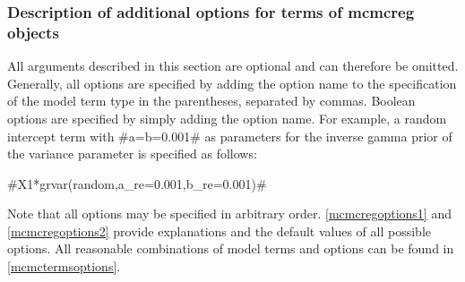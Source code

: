 \subsubsection{Description of additional options for terms of mcmcreg objects}
\label{mcmclocaloptions}

All arguments described in this section are optional and can
therefore be omitted. Generally, all options are specified by
adding the option name to the specification of the model term type
in the parentheses, separated by commas. Boolean options are
specified by simply adding the option name. For example, a random
intercept term with #a=b=0.001# as parameters for the inverse
gamma prior of the variance parameter is
specified as follows:

#X1*grvar(random,a_re=0.001,b_re=0.001)#

Note that all options may be specified in arbitrary order.
\autoref{mcmcregoptions1} and \autoref{mcmcregoptions2} provide explanations and the default values of
all possible options. All reasonable combinations of model terms
and options can be found in \autoref{mcmctermsoptions}.


